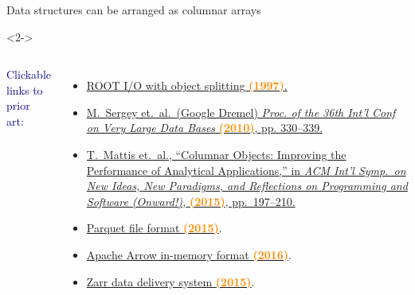 \documentclass[aspectratio=169]{beamer}
\begin{document}
\begin{frame}{Data structures can be arranged as columnar arrays}
\begin{center}
\end{center}

\vspace{-0.25 cm}
\begin{uncoverenv}<2->
\begin{columns}
\textcolor{darkblue}{Clickable links to prior art:}

\scriptsize
\begin{itemize}
\item \href{https://web.archive.org/web/19970225083621/http://root.cern.ch/root/HowtoWriteTree.html}{ROOT I/O with object splitting \textcolor{darkorange}{\bf (1997)}.}
\item \href{https://ai.google/research/pubs/pub36632}{M.\ Sergey et.\ al.\ (Google Dremel) {\it Proc. of the 36th Int'l Conf on Very Large Data Bases} \textcolor{darkorange}{\bf (2010)}, pp. 330--339.}
\item \href{https://dl.acm.org/citation.cfm?id=2814228.2814230}{T.\ Mattis et.\ al., ``Columnar Objects: Improving the Performance of Analytical Applications,'' in {\it ACM Int'l Symp.\ on New Ideas, New Paradigms, and Reflections on Programming and Software (Onward!),} \textcolor{darkorange}{\bf (2015)}, pp.\ 197--210.}
\item \href{https://parquet.apache.org}{Parquet file format \textcolor{darkorange}{\bf (2015)}}.
\item \href{https://arrow.apache.org}{Apache Arrow in-memory format \textcolor{darkorange}{\bf (2016)}}.
\item \href{https://zarr.readthedocs.io/en/stable/tutorial.html\#ragged-arrays}{Zarr data delivery system \textcolor{darkorange}{\bf (2015)}}.
\end{itemize}


\end{columns}
\end{uncoverenv}
\end{frame}
\end{document}
